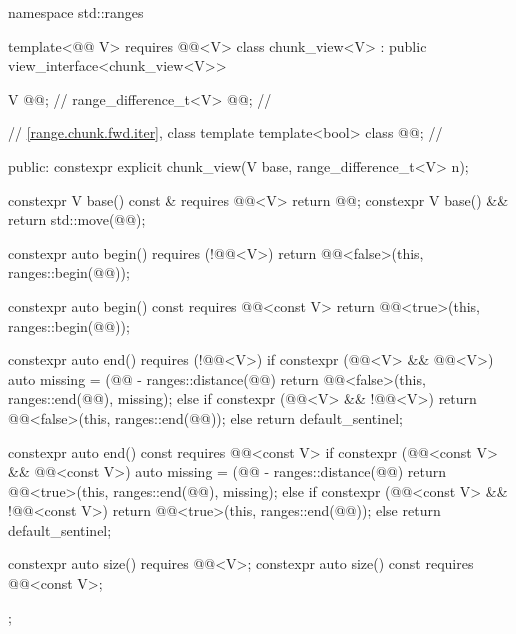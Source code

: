 %
%
%
\begin{codeblock}
namespace std::ranges {
  template<@@ V>
    requires @@<V>
  class chunk_view<V> : public view_interface<chunk_view<V>> {
    V @@;                            // \expos
    range_difference_t<V> @@;           // \expos

    // \ref{range.chunk.fwd.iter}, class template 
    template<bool> class @@;      // \expos

  public:
    constexpr explicit chunk_view(V base, range_difference_t<V> n);

    constexpr V base() const & requires @@<V> { return @@; }
    constexpr V base() && { return std::move(@@); }

    constexpr auto begin() requires (!@@<V>) {
      return @@<false>(this, ranges::begin(@@));
    }

    constexpr auto begin() const requires @@<const V> {
      return @@<true>(this, ranges::begin(@@));
    }

    constexpr auto end() requires (!@@<V>) {
      if constexpr (@@<V> && @@<V>) {
        auto missing = (@@ - ranges::distance(@@) %
        return @@<false>(this, ranges::end(@@), missing);
      } else if constexpr (@@<V> && !@@<V>) {
        return @@<false>(this, ranges::end(@@));
      } else {
        return default_sentinel;
      }
    }

    constexpr auto end() const requires @@<const V> {
      if constexpr (@@<const V> && @@<const V>) {
        auto missing = (@@ - ranges::distance(@@) %
        return @@<true>(this, ranges::end(@@), missing);
      } else if constexpr (@@<const V> && !@@<const V>) {
        return @@<true>(this, ranges::end(@@));
      } else {
        return default_sentinel;
      }
    }

    constexpr auto size() requires @@<V>;
    constexpr auto size() const requires @@<const V>;
  };
}
\end{codeblock}

